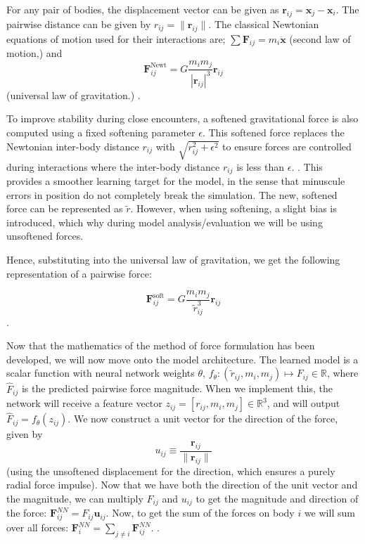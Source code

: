 \documentclass[12pt]{article}
\begin{document}
For any pair of bodies, the displacement vector can be given as $\mathbf{r}_{ij} = \mathbf{x}_j - \mathbf{x}_i$. The pairwise distance can be given by $r_{ij} = \|\mathbf{r}_{ij}\|$. The classical Newtonian equations of motion used for their interactions are; $\sum \mathbf{F}_{ij} = m_i \mathbf{\ddot x}$ (second law of motion,) and $$\mathbf{F}_{ij}^{\text{Newt}} = G \frac{m_i m_j}{|\mathbf{r}_{ij}|^3} \mathbf{r}_{ij}$$ (universal law of gravitation.) \cite{murray1999solar}.

To improve stability during close encounters, a softened gravitational force is also computed using a fixed softening parameter $\epsilon$. This softened force replaces the Newtonian inter-body distance $r_{ij}$ with $\sqrt{r^2_{ij} + \epsilon^2}$ to ensure forces are controlled during interactions where the inter-body distance $r_{ij}$ is less than $\epsilon$. \cite{Dehnen2001}. This provides a smoother learning target for the model, in the sense that minuscule errors in position do not completely break the simulation. The new, softened force can be represented as $\tilde{r}$. However, when using softening, a slight bias is introduced, which why during model analysis/evaluation we will be using unsoftened forces.

Hence, substituting into the universal law of gravitation, we get the following representation of a pairwise force:

$$\mathbf{F}_{ij}^{\text{soft}} = G \frac{m_i m_j}{\tilde{r}_{ij}^3} \mathbf{r}_{ij}$$.

Now that the mathematics of the method of force formulation has been developed, we will now move onto the model architecture. The learned model is a scalar function with neural network weights $\theta$, $f_{\theta} : (\tilde{r}_{ij}, m_i, m_j) \mapsto F_{ij} \in \mathbb{R}$, where $\hat{F}_{ij}$ is the predicted pairwise force magnitude. When we implement this, the network will receive a feature vector $z_{ij} = [r_{ij}, m_i, m_j] \in \mathbb{R}^3$, and will output $\hat{F}_{ij} = f_{\theta}(z_{ij})$. We now construct a unit vector for the direction of the force, given by
$$u_{ij} \equiv \frac{\mathbf{r}_{ij}}{\|\mathbf{r}_{ij}\|}$$
(using the unsoftened displacement for the direction, which ensures a purely radial force impulse).
Now that we have both the direction of the unit vector and the magnitude, we can multiply $\hat{F}_{ij}$ and $u_{ij}$ to get the magnitude and direction of the force: $\mathbf{F}_{ij}^{NN} = F_{ij} \mathbf{u}_{ij}$. Now, to get the sum of the forces on body $i$ we will sum over all forces: $\mathbf{F}_{i}^{NN} = \sum_{j \neq i} \mathbf{F}_{ij}^{NN}$. \cite{kipf2018neural}.
\end{document}
